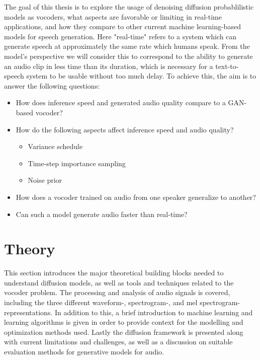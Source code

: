 \documentclass{report}
\begin{document}
The goal of this thesis is to explore the usage of denoising diffusion probablilistic models as vocoders, what aspects are favorable or limiting in real-time applications, and how they compare to other current machine learning-based models for speech generation. Here "real-time" refers to a system which can generate speech at approximately the same rate which humans speak. From the model's perspective we will consider this to correspond to the ability to generate an audio clip in less time than its duration, which is necessary for a text-to-speech system to be usable without too much delay. To achieve this, the aim is to answer the following questions:

\begin{itemize}
    \item How does inference speed and generated audio quality compare to a GAN-based vocoder?
    \item How do the following aspects affect inference speed and audio quality?
    \begin{itemize}
        \item Variance schedule
        \item Time-step importance sampling
        \item Noise prior
    \end{itemize}
    \item How does a vocoder trained on audio from one speaker generalize to another?
    \item Can such a model generate audio faster than real-time?
\end{itemize}

\newpage
\chapter{Theory}

This section introduces the major theoretical building blocks needed to understand diffusion models, as well as tools and techniques related to the vocoder problem. The processing and analysis of audio signals is covered, including the three different waveform-, spectrogram-, and mel spectrogram-representations. In addition to this, a brief introduction to machine learning and learning algorithms is given in order to provide context for the modelling and optimization methods used. Lastly the diffusion framework is presented along with current limitations and challenges, as well as a discussion on suitable evaluation methods for generative models for audio.
\end{document}
